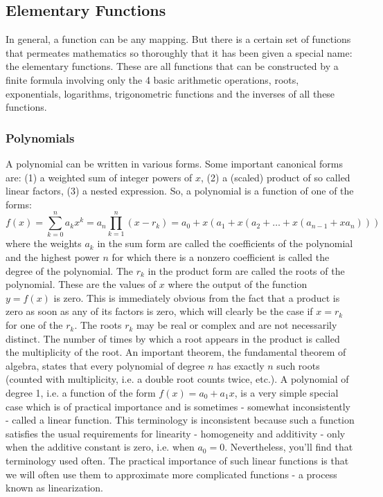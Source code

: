 

\subsection{Elementary Functions}
In general, a function can be any mapping. But there is a certain set of functions that permeates mathematics so thoroughly that it has been given a special name: the elementary functions. These are all functions that can be constructed by a finite formula involving only the 4 basic arithmetic operations, roots, exponentials, logarithms, trigonometric functions and the inverses of all these functions.


\subsubsection{Polynomials}
A polynomial can be written in various forms. Some important canonical forms are: (1) a weighted sum of integer powers of $x$, (2) a (scaled) product of so called linear factors, (3) a nested expression. So, a polynomial is a function of one of the forms:
\begin{equation}
 f(x) = \sum_{k=0}^n a_k x^k 
      = a_n \prod_{k=1}^{n} (x - r_k)
      = a_0 + x(a_1 + x(a_2 + \ldots + x(a_{n-1} + x a_n)))
\end{equation}
where the weights $a_k$ in the sum form are called the coefficients of the polynomial and the highest power $n$ for which there is a nonzero coefficient is called the degree of the polynomial. The $r_k$ in the product form are called the roots of the polynomial. These are the values of $x$ where the output of the function $y = f(x)$ is zero. This is immediately obvious from the fact that a product is zero as soon as any of its factors is zero, which will clearly be the case if $x = r_k$ for one of the $r_k$. The roots $r_k$ may be real or complex and are not necessarily distinct. The number of times by which a root appears in the product is called the multiplicity of the root. An important theorem, the fundamental theorem of algebra, states that every polynomial of degree $n$ has exactly $n$ such roots (counted with multiplicity, i.e. a double root counts twice, etc.). A polynomial of degree 1, i.e. a function of the form $f(x) = a_0 + a_1  x$, is a very simple special case which is of practical importance and is sometimes - somewhat inconsistently - called a linear function. This terminology is inconsistent because such a function satisfies the usual requirements for linearity - homogeneity and additivity - only when the additive constant is zero, i.e. when $a_0 = 0$. Nevertheless, you'll find that terminology used often. The practical importance of such linear functions is that we will often use them to approximate more complicated functions - a process known as linearization. 

